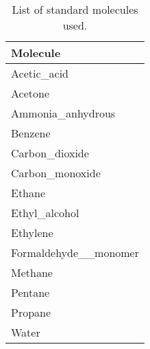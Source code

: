 \begin{longtable}{|l|} 
\caption{List of standard molecules used.}\\ \hline
\toprule
\textbf{Molecule}\\ \hline
\endhead
Acetic\_acid\\ \hline
Acetone\\ \hline
Ammonia\_anhydrous\\ \hline
Benzene\\ \hline
Carbon\_dioxide\\ \hline
Carbon\_monoxide\\ \hline
Ethane\\ \hline
Ethyl\_alcohol\\ \hline
Ethylene\\ \hline
Formaldehyde\_\_monomer\\ \hline
Methane\\ \hline
Pentane\\ \hline
Propane\\ \hline
Water\\ \hline
\bottomrule
\end{longtable}
